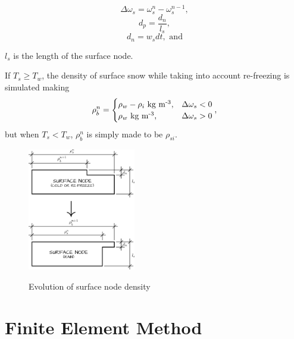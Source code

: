 \documentclass{article}%
\newcommand{\sups}[1]{\ensuremath{^{\textrm{#1}}}}
\begin{document}
  $$\Delta \omega_s = \omega_s^{n} - \omega_s^{n-1},$$ 
  $$d_p = \frac{d_n}{l_s},$$
  $$d_n = w_sdt,\text{ and}$$
  \begin{center}$l_s$ is the length of the surface node.\end{center}
If $T_s \geq T_w$, the density of surface snow while taking into account re-freezing is simulated making
  $$
  \rho_{\dot{b}}^n = 
  \begin{cases}
    \rho_w - \rho_i\ \text{kg m\sups{-3}},  &\Delta\omega_s < 0\\
    \rho_w\ \text{kg m\sups{-3}}, &\Delta\omega_s > 0\\
  \end{cases},
  $$
but when $T_s < T_w$, $\rho_{\dot{b}}^n$ is simply made to be $\rho_{si}$.
\begin{figure}[H]
	\centering
		\includegraphics[width=0.42\textwidth]{images/surfaceDensity.png}
	\label{fig:500 year orbit}
	\caption{Evolution of surface node density}
\end{figure}

\section{Finite Element Method}
\end{document}
